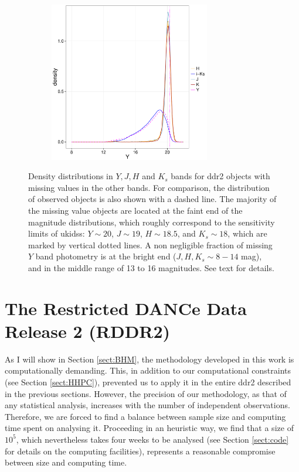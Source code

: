 \begin{figure}[ht!]
\begin{subfigure}[t]{0.45\textwidth}
    \end{subfigure}
     \begin{subfigure}[t]{0.45\textwidth}
      \includegraphics[page=4,height=7cm]{background/Figures/MissingDistributionsDDR2.pdf}
    \end{subfigure}
\caption{Density distributions in $Y,J,H$ and $K_s$ bands for \gls{ddr2} objects with missing values in the other bands. For comparison, the distribution of observed objects is also shown with a dashed line. The majority of the missing value objects are located at the faint end of the magnitude distributions, which roughly correspond to the sensitivity limits of \gls{ukidss}: $Y \sim 20$, $J \sim 19$, $H\sim18.5$, and $K_s \sim 18$, which are marked by vertical dotted lines. A non negligible fraction of missing  $Y$ band photometry is at the bright end ($J,H,K_s \sim 8 - 14$ mag), and in the middle range of 13 to 16 magnitudes. See text for details.}
\label{fig:NAsDDR2}
\end{figure}


\section{The Restricted DANCe Data Release 2 (RDDR2)}
\label{sect:RDR2}

As I will show in Section \ref{sect:BHM}, the methodology developed in this work is computationally demanding. This, in addition to our computational constraints (see Section \ref{sect:HHPC}), prevented us to apply it in the entire \gls{ddr2} described in the previous sections.
However, the precision of our methodology, as that of any statistical analysis, increases with the number of independent observations. Therefore, we are forced to find a balance between sample size and computing time spent on analysing it. Proceeding in an heuristic way, we find that a size of $10^5$, which nevertheless takes four weeks to be analysed (see Section \ref{sect:code} for details on the computing facilities), represents a reasonable compromise between size and computing time.

